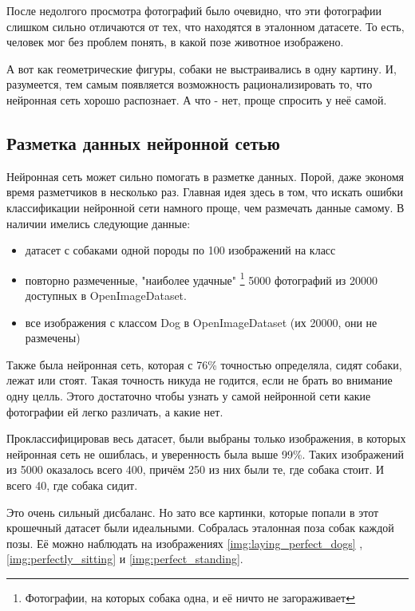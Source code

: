 После недолгого просмотра фотографий было очевидно, что эти фотографии слишком сильно отличаются от тех, что находятся в эталонном датасете. То есть, человек мог без проблем понять, в какой позе животное изображено.

А вот как геометрические фигуры, собаки не выстраивались в одну картину. И, разумеется, тем самым появляется возможность рационализировать то, что нейронная сеть хорошо распознает. А что - нет, проще спросить у неё самой.

\subsection{Разметка данных нейронной сетью} \label{nn_labeling}
Нейронная сеть может сильно помогать в разметке данных. Порой, даже экономя время разметчиков в несколько раз. Главная идея здесь в том, что искать ошибки классификации нейронной сети намного проще, чем размечать данные самому. 
В наличии имелись следующие данные:
\begin{itemize}
    \item датасет с собаками одной породы по 100 изображений на класс
    \item повторно размеченные, "наиболее удачные"
    \footnote{Фотографии, на которых собака одна, и её ничто не загораживает} 
    5000 фотографий из 20000 доступных в OpenImageDataset.
    \item все изображения с классом Dog в OpenImageDataset (их 20000, они не размечены)
\end{itemize}


Также была нейронная сеть, которая с 76\% точностью определяла, сидят собаки, лежат или стоят. Такая точность никуда не годится, если не брать во внимание одну целль. Этого достаточно чтобы узнать у самой нейронной сети какие фотографии ей легко различать, а какие нет.

Проклассифицировав весь датасет, были выбраны только изображения, в которых нейронная сеть не ошиблась, и уверенность была выше 99\%. Таких изображений из 5000 оказалось всего 400, причём 250 из них были те, где собака стоит. И всего 40, где собака сидит. 

Это очень сильный дисбаланс. Но зато все картинки, которые попали в этот крошечный датасет были идеальными. Собралась эталонная поза собак каждой позы. Её можно наблюдать на изображениях \ref{img:laying_perfect_dogs} , \ref{img:perfectly_sitting}  и \ref{img:perfect_standing}.


